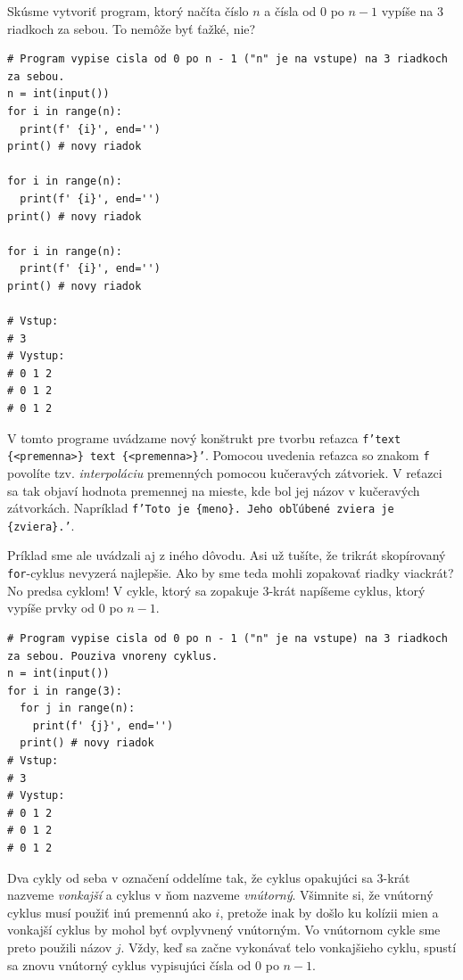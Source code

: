 Skúsme vytvoriť program, ktorý načíta číslo $n$ a čísla od $0$ po $n - 1$ vypíše na 3 riadkoch za sebou. To nemôže byť ťažké, nie?
\begin{lstlisting}
# Program vypise cisla od 0 po n - 1 ("n" je na vstupe) na 3 riadkoch za sebou.
n = int(input())
for i in range(n):
  print(f' {i}', end='')
print() # novy riadok

for i in range(n):
  print(f' {i}', end='')
print() # novy riadok

for i in range(n):
  print(f' {i}', end='')
print() # novy riadok

# Vstup:
# 3
# Vystup:
# 0 1 2
# 0 1 2
# 0 1 2
\end{lstlisting}
V tomto programe uvádzame nový konštrukt pre tvorbu reťazca \texttt{f'text \{<premenna>\} text \{<premenna>\}'}. Pomocou uvedenia reťazca so znakom \texttt{f} povolíte tzv. \textit{interpoláciu} premenných pomocou kučeravých zátvoriek. V reťazci sa tak objaví hodnota premennej na mieste, kde bol jej názov v kučeravých zátvorkách. Napríklad \texttt{f'Toto je \{meno\}. Jeho obľúbené zviera je \{zviera\}.'}.

Príklad sme ale uvádzali aj z iného dôvodu. Asi už tušíte, že trikrát skopírovaný \texttt{for}-cyklus nevyzerá najlepšie. Ako by sme teda mohli zopakovať riadky viackrát? No predsa cyklom! V cykle, ktorý sa zopakuje $3$-krát napíšeme cyklus, ktorý vypíše prvky od $0$ po $n - 1$.
\begin{lstlisting}
# Program vypise cisla od 0 po n - 1 ("n" je na vstupe) na 3 riadkoch za sebou. Pouziva vnoreny cyklus.
n = int(input())
for i in range(3):
  for j in range(n):
    print(f' {j}', end='')
  print() # novy riadok
# Vstup:
# 3
# Vystup:
# 0 1 2
# 0 1 2
# 0 1 2
\end{lstlisting}
Dva cykly od seba v označení oddelíme tak, že cyklus opakujúci sa $3$-krát nazveme \textit{vonkajší} a cyklus v ňom nazveme \textit{vnútorný}. Všimnite si, že vnútorný cyklus musí použiť inú premennú ako $i$, pretože inak by došlo ku kolízii mien a vonkajší cyklus by mohol byť ovplyvnený vnútorným. Vo vnútornom cykle sme preto použili názov $j$.
Vždy, keď sa začne vykonávať telo vonkajšieho cyklu, spustí sa znovu vnútorný cyklus vypisujúci čísla od $0$ po $n - 1$.


